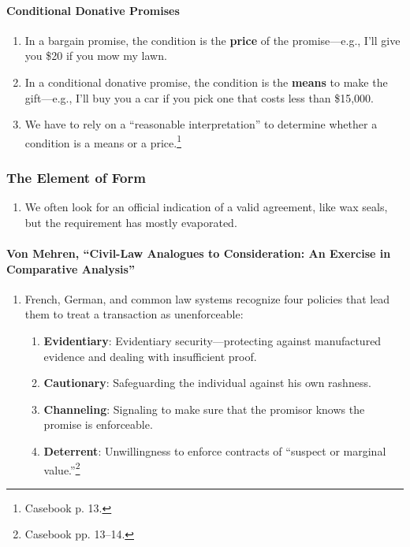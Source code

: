 \paragraph{Conditional Donative Promises}

\begin{enumerate}
    \item In a bargain promise, the condition is the \textbf{price} of the 
    promise---e.g., I'll give you \$20 if you mow my lawn.
    \item In a conditional donative promise, the condition is the 
    \textbf{means} to make the gift---e.g., I'll buy you a car if you pick one 
    that costs less than \$15,000.  \item We have to rely on a ``reasonable 
    interpretation'' to determine 
    whether a condition is a means or a price.\footnote{Casebook p. 13.}
\end{enumerate}

\subsubsection{The Element of Form}

\begin{enumerate}
    \item We often look for an official indication of a valid 
    agreement, like wax seals, but the requirement has mostly evaporated.
\end{enumerate}

\paragraph{Von Mehren, ``Civil-Law Analogues to Consideration: An Exercise 
in Comparative Analysis''}

\begin{enumerate}
    \item French, German, and common law systems recognize four policies that 
    lead them to treat a transaction as unenforceable:
    \begin{enumerate}
        \item \textbf{Evidentiary}: Evidentiary security---protecting against 
        manufactured evidence and dealing with insufficient proof.
        \item \textbf{Cautionary}: Safeguarding the individual against his own 
        rashness.
        \item \textbf{Channeling}: Signaling to make sure that the promisor 
        knows the promise is enforceable.
        \item \textbf{Deterrent}: Unwillingness to enforce contracts of 
        ``suspect or marginal value.''\footnote{Casebook pp. 13--14.}
    \end{enumerate}
\end{enumerate}

